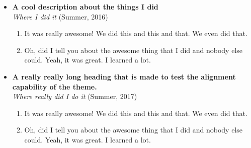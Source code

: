 \begin{itemize}

\item
    {\bf A cool description about the things I did}
    \\{\it Where I did it}
    \hfill (Summer, 2016)
    \begin{enumerate}
        \item It was really awesome! We did this and this and that. We even did that.
        \item Oh, did I tell you about the awesome thing that I did and nobody else could. Yeah, it was great. I learned a lot.
    \end{enumerate}

\item
    {\bf A really really long heading that is made to test the alignment capability of the theme.}
    \\{\it Where really did I do it}
    \hfill (Summer, 2017)
    \begin{enumerate}
        \item It was really awesome! We did this and this and that. We even did that.
        \item Oh, did I tell you about the awesome thing that I did and nobody else could. Yeah, it was great. I learned a lot.
    \end{enumerate}

\end{itemize}
